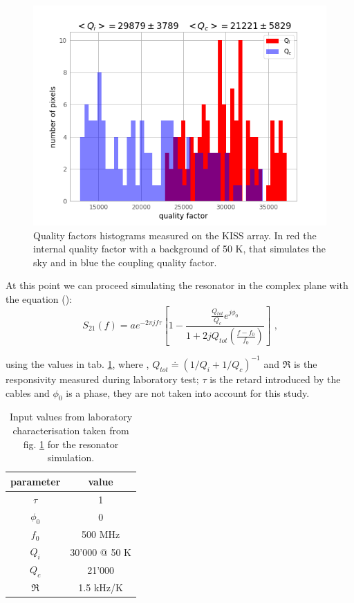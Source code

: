 \begin{figure}[htf]
	\centering
	\includegraphics[width=.5\textwidth]{3.acqui/Q_hist.png}
	\caption{Quality factors histograms measured on the KISS array. In red the internal quality factor with a background of 50 K, that simulates the sky and in blue the coupling quality factor.}
	\label{fig:hist}
\end{figure}

\noindent At this point we can proceed simulating the resonator in the complex plane with the equation (\cite{Gao}):
\begin{equation}
S_{21}(f)=ae^{-2\pi j f \tau} \left[ 1-\frac{\frac{Q_{tot}}{Q_c}e^{j\phi_0}}{1+2jQ_{tot}\left(\frac{f-f_0}{f_0}\right)}\right] \text{ ,}
\label{eq:s21_IQ}
\end{equation}

\noindent using the values in tab. \ref{tab:s21_values}, where , $Q_{tot}\doteq\left( 1/Q_i + 1/Q_c \right)^{-1}$ and $\mathfrak{R}$ is the responsivity measured during laboratory test; $\tau$ is the retard introduced by the cables and $\phi_0$ is a phase, they are not taken into account for this study.

\begin{table}[htf]
	\footnotesize
	\centering
	\caption{Input values from laboratory characterisation taken from fig. \ref{fig:hist} for the resonator simulation.}
	\begin{tabular}{cc}
		\toprule
		\textbf{parameter} & \textbf{value} \\
		\toprule
		$\tau$ & 1 \\ 
		\midrule 
		$\phi_0$ & 0 \\
		\midrule
		$f_0$ & 500 MHz \\  
		\midrule 
		$Q_i$ & 30'000 @ 50 K \\ 
		\midrule 
		$Q_c$ & 21'000 \\ 
		\midrule 
		$\mathfrak{R}$  & 1.5 kHz/K \\ 
		\bottomrule
	\end{tabular}
\label{tab:s21_values}
\end{table}


